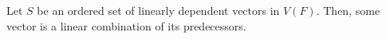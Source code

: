 

\begin{theorem}
    Let $S$ be an ordered set of linearly dependent vectors in $V(F)$. Then, some vector is a linear combination of its predecessors.
\end{theorem}
